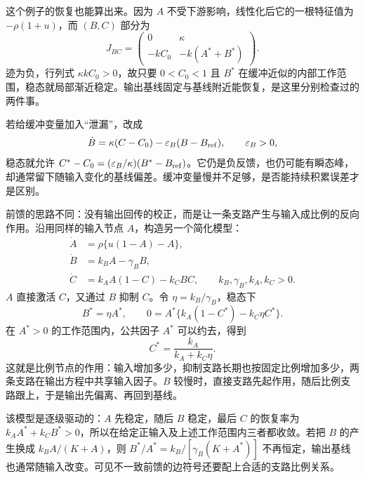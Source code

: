 这个例子的恢复也能算出来。因为 $A$ 不受下游影响，线性化后它的一根特征值为 $-\rho(1+u)$，而 $(B,C)$ 部分为
\[
J_{BC}=\begin{pmatrix}0&\kappa\\-kC_0&-k(A^*+B^*)\end{pmatrix}.
\]
迹为负，行列式 $\kappa kC_0>0$，故只要 $0<C_0<1$ 且 $B^*$ 在缓冲近似的内部工作范围，稳态就局部渐近稳定。输出基线固定与基线附近能恢复，是这里分别检查过的两件事。

若给缓冲变量加入“泄漏”，改成
\[
\dot B=\kappa(C-C_0)-\varepsilon_B(B-B_{\rm ref}),\qquad\varepsilon_B>0,
\]
稳态就允许 $C^*-C_0=(\varepsilon_B/\kappa)(B^*-B_{\rm ref})$。它仍是负反馈，也仍可能有瞬态峰，却通常留下随输入变化的基线偏差。缓冲变量慢并不足够，是否能持续积累误差才是区别。


前馈的思路不同：没有输出回传的校正，而是让一条支路产生与输入成比例的反向作用。沿用同样的输入节点 $A$，构造另一个简化模型：
\begin{align}
\dot A&=\rho\{u(1-A)-A\},\\
\dot B&=k_BA-\gamma_BB,\\
\dot C&=k_AA(1-C)-k_CB C,\qquad k_B,\gamma_B,k_A,k_C>0.
\end{align}
$A$ 直接激活 $C$，又通过 $B$ 抑制 $C$。令 $\eta=k_B/\gamma_B$，稳态下
\[
B^*=\eta A^*,\qquad
0=A^*\{k_A(1-C^*)-k_C\eta C^*\}.
\]
在 $A^*>0$ 的工作范围内，公共因子 $A^*$ 可以约去，得到
\[
C^*=\frac{k_A}{k_A+k_C\eta}.
\]
这就是比例节点的作用：输入增加多少，抑制支路长期也按固定比例增加多少，两条支路在输出方程中共享输入因子。$B$ 较慢时，直接支路先起作用，随后比例支路跟上，于是输出先偏离、再回到基线。

该模型是逐级驱动的：$A$ 先稳定，随后 $B$ 稳定，最后 $C$ 的恢复率为 $k_AA^*+k_CB^*>0$，所以在给定正输入及上述工作范围内三者都收敛。若把 $B$ 的产生换成 $k_BA/(K+A)$，则 $B^*/A^*=k_B/[\gamma_B(K+A^*)]$ 不再恒定，输出基线也通常随输入改变。可见不一致前馈的边符号还要配上合适的支路比例关系。

